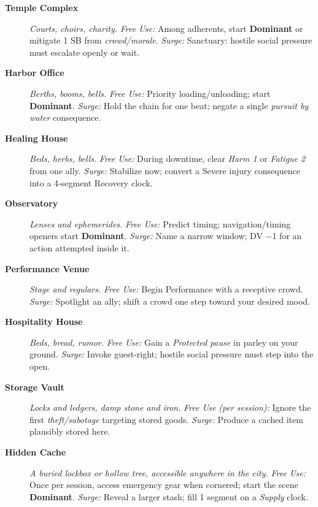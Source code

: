 \begin{description}
  \item[\textbf{Temple Complex}]  \emph{Courts, choirs, charity.} \emph{Free Use:} Among adherents, start \textbf{Dominant} or mitigate 1 SB from \emph{crowd/morale}. \emph{Surge:} Sanctuary: hostile social pressure must escalate openly or wait.

  \item[\textbf{Harbor Office}]  \emph{Berths, booms, bells.} \emph{Free Use:} Priority loading/unloading; start \textbf{Dominant}. \emph{Surge:} Hold the chain for one beat; negate a single \emph{pursuit by water} consequence.

  \item[\textbf{Healing House}]  \emph{Beds, herbs, bells.} \emph{Free Use:} During downtime, clear \emph{Harm 1} or \emph{Fatigue 2} from one ally. \emph{Surge:} Stabilize now; convert a Severe injury consequence into a 4‑segment Recovery clock.

  \item[\textbf{Observatory}]  \emph{Lenses and ephemerides.} \emph{Free Use:} Predict timing; navigation/timing openers start \textbf{Dominant}. \emph{Surge:} Name a narrow window; DV −1 for an action attempted inside it.

  \item[\textbf{Performance Venue}]  \emph{Stage and regulars.} \emph{Free Use:} Begin Performance with a receptive crowd. \emph{Surge:} Spotlight an ally; shift a crowd one step toward your desired mood.

  \item[\textbf{Hospitality House}]  \emph{Beds, bread, rumor.} \emph{Free Use:} Gain a \emph{Protected pause} in parley on your ground. \emph{Surge:} Invoke guest-right; hostile social pressure must step into the open.

  \item[\textbf{Storage Vault}]  \emph{Locks and ledgers, damp stone and iron.} \emph{Free Use (per session):} Ignore the first \emph{theft/sabotage} targeting stored goods. \emph{Surge:} Produce a cached item plausibly stored here.

  \item[\textbf{Hidden Cache}]  \emph{A buried lockbox or hollow tree, accessible anywhere in the city.} \emph{Free Use:} Once per session, access emergency gear when cornered; start the scene \textbf{Dominant}. \emph{Surge:} Reveal a larger stash; fill 1 segment on a \emph{Supply} clock.


\end{description}
